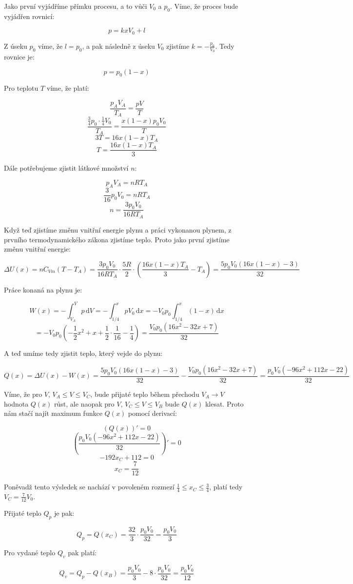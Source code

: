 \documentclass{fkssolpub}
\author{Ondřej Sedláček}
\renewcommand{\d}{\mathrm{d}}
\begin{document}
Jako první vyjádříme přímku procesu, a to vůči $V_0$ a $p_0$. Víme, že proces bude vyjádřen rovnicí:

\[
	p = k x V_0 + l
\]

Z úseku $p_0$ víme, že $l = p_0$, a pak následně z úseku $V_0$ zjistíme $k = - \frac{p_0}{V_0}$. Tedy rovnice je:

\[
	p = p_0 (1 - x)
\]

Pro teplotu $T$ víme, že platí:

\[
	\frac{p_A V_A}{T_A} = \frac{p V}{T}
\]
\[
	\frac{\frac{3}{4} p_0 \cdot \frac{1}{4} V_0}{T_A} = \frac{x (1 - x) p_0 V_0}{T}
\]
\[
	3 T = 16 x (1 - x) T_A
\]
\[
	T = \frac{16 x (1 - x) T_A}{3}
\]

Dále potřebujeme zjistit látkové množství $n$:

\[
	p_A V_A = n R T_A
\]
\[
	\frac{3}{16} p_0 V_0 = n R T_A
\]
\[
	n = \frac{3 p_0 V_0}{16 R T_A}
\]

Když teď zjistíme změnu vnitřní energie plynu a práci vykonanou plynem, z prvního termodynamického zákona zjistíme teplo. Proto jako první zjistíme změnu vnitřní energie:

\[
	\Delta U(x) = n C_{Vm} (T - T_A) = \frac{3 p_0 V_0}{16 R T_A} \cdot \frac{5R}{2} \cdot \left(\frac{16 x (1 - x) T_A}{3} - T_A\right) = \frac{5 p_0 V_0 (16 x (1 - x) - 3)}{32}
\]

Práce konaná na plynu je:

\[
	W(x) = - \int_{V_A}^V p \, \d V = - \int_{1/4}^x p V_0 \, \d x= - V_0 p_0 \int_{1/4}^x (1-x) \, \d x
\]
\[
	= - V_0 p_0 \left(- \frac{1}{2} x^2 + x + \frac{1}{2} \cdot \frac{1}{16} - \frac{1}{4}\right) = \frac{V_0 p_0 \left(16 x^2 - 32 x + 7\right)}{32}
\]

A teď umíme tedy zjistit teplo, který vejde do plynu:

\[
	Q(x) = \Delta U(x) - W(x) = \frac{5 p_0 V_0 (16 x (1 - x) - 3)}{32} - \frac{V_0 p_0 \left(16 x^2 - 32 x + 7\right)}{32} = \frac{p_0 V_0 (-96 x^2 + 112x - 22)}{32}
\]

Víme, že pro $V$, $V_A \leq V \leq V_C$, bude přijaté teplo během přechodu $V_A \to V$ hodnota $Q(x)$ růst, ale naopak pro $V$, $V_C \leq V \leq V_B$ bude $Q(x)$ klesat. Proto nám stačí najít maximum funkce $Q(x)$ pomocí derivací:

\[
	(Q(x))' = 0
\]
\[
	\left( \frac{p_0 V_0 (-96 x^2 + 112x - 22)}{32} \right)' = 0
\]
\[
	-192x_C + 112 = 0
\]
\[
	x_C = \frac{7}{12}
\]

Poněvadž tento výsledek se nachází v povoleném rozmezí $\frac{1}{4} \leq x_C \leq \frac{3}{4}$, platí tedy $V_C = \frac{7}{12} V_0$.

Přijaté teplo $Q_p$ je pak:

\[
	Q_p = Q(x_C) = \frac{32}{3} \cdot \frac{p_0 V_0}{32} = \frac{p_0 V_0}{3}
\]

Pro vydané teplo $Q_v$ pak platí:

\[
	Q_v = Q_p - Q(x_B) = \frac{p_0 V_0}{3} - 8 \cdot \frac{p_0 V_0}{32} = \frac{p_0 V_0}{12}
\]
\end{document}

